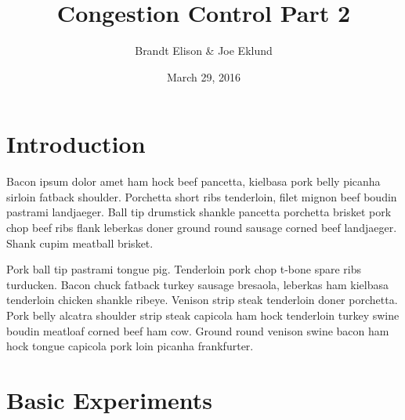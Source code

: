 \documentclass[11pt]{article}
\begin{document}
\lstset{
  language=Python,
  basicstyle=\small,          %
  keywordstyle=\bfseries,
  identifierstyle=,           %
  commentstyle=,              %
  stringstyle=\ttfamily,      %
  showstringspaces=false,     %
  numbers=left,
  numberstyle=\tiny,
  numbersep=5pt,
  frame=tb
}

\title{Congestion Control Part 2}

\author{Brandt Elison & Joe Eklund}

\date{March 29, 2016}

\maketitle

\section{Introduction}

Bacon ipsum dolor amet ham hock beef pancetta, kielbasa pork belly picanha sirloin fatback shoulder. Porchetta short ribs tenderloin, filet mignon beef boudin pastrami landjaeger. Ball tip drumstick shankle pancetta porchetta brisket pork chop beef ribs flank leberkas doner ground round sausage corned beef landjaeger. Shank cupim meatball brisket.

Pork ball tip pastrami tongue pig. Tenderloin pork chop t-bone spare ribs turducken. Bacon chuck fatback turkey sausage bresaola, leberkas ham kielbasa tenderloin chicken shankle ribeye. Venison strip steak tenderloin doner porchetta. Pork belly alcatra shoulder strip steak capicola ham hock tenderloin turkey swine boudin meatloaf corned beef ham cow. Ground round venison swine bacon ham hock tongue capicola pork loin picanha frankfurter.

\section{Basic Experiments}
\end{document}
